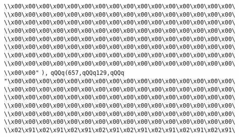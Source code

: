 \verb|\\x00\x00\x00\x00\x00\x00\x00\x00\x00\x00\x00\x00\x00\x00\x00\x00\|\newline
\verb|\\x00\x00\x00\x00\x00\x00\x00\x00\x00\x00\x00\x00\x00\x00\x00\x00\|\newline
\verb|\\x00\x00\x00\x00\x00\x00\x00\x00\x00\x00\x00\x00\x00\x00\x00\x00\|\newline
\verb|\\x00\x00\x00\x00\x00\x00\x00\x00\x00\x00\x00\x00\x00\x00\x00\x00\|\newline
\verb|\\x00\x00\x00\x00\x00\x00\x00\x00\x00\x00\x00\x00\x00\x00\x00\x00\|\newline
\verb|\\x00\x00\x00\x00\x00\x00\x00\x00\x00\x00\x00\x00\x00\x00\x00\x00\|\newline
\verb|\\x00\x00\x00\x00\x00\x00\x00\x00\x00\x00\x00\x00\x00\x00\x00\x00\|\newline
\verb|\\x00\x00\x00\x00\x00\x00\x00\x00\x00\x00\x00\x00\x00\x00\x00\x00\|\newline
\verb|\\x00\x00"|\newline
\verb|),|\newline
\verb|qQQq(657,qQQq129,qQQq|\newline
\verb|"\x00\x00\x00\x00\x00\x00\x00\x00\x00\x00\x00\x00\x00\x00\x00\x00\|\newline
\verb|\\x00\x00\x00\x00\x00\x00\x00\x00\x00\x00\x00\x00\x00\x00\x00\x00\|\newline
\verb|\\x00\x00\x00\x00\x00\x00\x00\x00\x00\x00\x00\x00\x00\x00\x00\x00\|\newline
\verb|\\x00\x00\x00\x00\x00\x00\x00\x00\x00\x00\x00\x00\x00\x00\x00\x00\|\newline
\verb|\\x00\x00\x00\x00\x00\x00\x00\x00\x00\x00\x00\x00\x00\x00\x00\x00\|\newline
\verb|\\x00\x00\x00\x00\x00\x00\x00\x00\x00\x00\x00\x00\x00\x00\x00\x00\|\newline
\verb|\\x02\x91\x02\x91\x02\x91\x02\x91\x02\x91\x02\x91\x02\x91\x02\x91\|\newline

